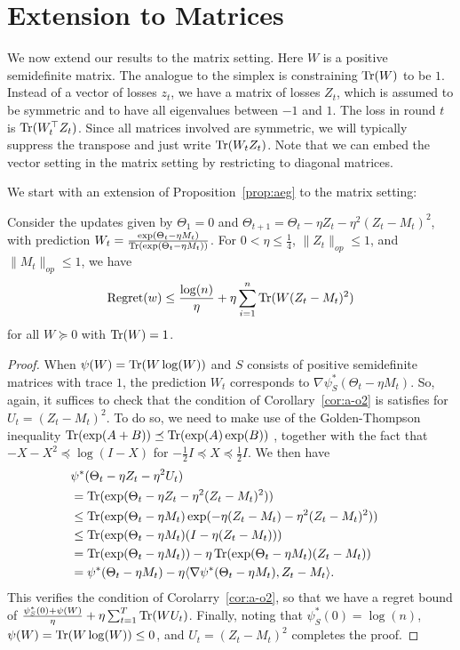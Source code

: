\documentclass[paper_icml.tex]{subfiles}
\begin{document}
\section{Extension to Matrices} 
\label{sec:matrix}
We now extend our results to the matrix setting. Here $W$ is a positive semidefinite 
matrix. The analogue to the simplex is constraining $\operatorname{Tr}(W)$ to be $1$. Instead of a vector 
of losses $z_t$, we have a matrix of losses $Z_t$, which is assumed to be symmetric and to 
have all eigenvalues between $-1$ and $1$. The loss in round $t$ is $\operatorname{Tr}(W_t^{\top}Z_t)$. 
Since all matrices involved are symmetric, we will typically suppress the transpose and 
just write $\operatorname{Tr}(W_tZ_t)$. Note that we can embed the vector setting in the matrix setting 
by restricting to diagonal matrices.

We start with an extension of Proposition~\ref{prop:aeg} to the matrix setting:
\begin{proposition}
\label{prop:maeg}
Consider the updates given by $\Theta_1 = 0$ and 
$\Theta_{t+1} = \Theta_t - \eta Z_t - \eta^2 (Z_t - M_t)^2$, 
with prediction $W_t = \frac{\exp(\Theta_t - \eta M_t)}{\operatorname{Tr}(\exp(\Theta_t - \eta M_t))}$. For $0 < \eta \leq \frac{1}{4}$, $\|Z_t\|_{op} \leq 1$, and $\|M_t\|_{op} \leq 1$, we have
\begin{equation}
\operatorname{Regret}(w) \leq \frac{\log(n)}{\eta} + \eta \sum_{i=1}^n \operatorname{Tr}(W(Z_t-M_t)^2)
\end{equation}
for all $W \succeq 0$ with $\operatorname{Tr}(W) = 1$.
\end{proposition}
\begin{proof}
When $\psi(W) = \operatorname{Tr}(W\log(W))$ and $S$ consists of positive semidefinite 
matrices with trace $1$, the prediction $W_t$ corresponds to 
$\nabla \psi_S^*(\Theta_t - \eta M_t)$. So, again, it suffices to check 
that the condition of Corollary~\ref{cor:a-o2} is satisfies for 
$U_t = (Z_t - M_t)^2$. To do so, we need to make use of the 
Golden-Thompson inequality $\operatorname{Tr}(\exp(A+B)) \preceq \operatorname{Tr}(\exp(A)\exp(B))$ \cite{golden, thompson}, 
together with the fact that $-X-X^2 \preceq \log(I-X)$ for 
$-\frac{1}{2}I \preceq X \preceq \frac{1}{2}I$. We then have
\begin{align*}
\lefteqn{\psi^*(\Theta_t - \eta Z_t - \eta^2 U_t)} \\
 &= \Tr(\exp(\Theta_t - \eta Z_t - \eta^2 (Z_t - M_t)^2)) \\
 &\leq \Tr(\exp(\Theta_t - \eta M_t)\exp(-\eta (Z_t - M_t) - \eta^2 (Z_t - M_t)^2)) \\
 &\leq \Tr(\exp(\Theta_t - \eta M_t)(I - \eta (Z_t - M_t))) \\
 &= \Tr(\exp(\Theta_t - \eta M_t)) - \eta \Tr(\exp(\Theta_t - \eta M_t)(Z_t - M_t)) \\
 &= \psi^*(\Theta_t - \eta M_t) - \eta \langle \nabla \psi^*(\Theta_t - \eta M_t), Z_t - M_t \rangle.
\end{align*}
This verifies the condition of Corolarry~\ref{cor:a-o2}, so that we have 
a regret bound of $\frac{\psi_S^*(0) + \psi(W)}{\eta} + \eta \sum_{t=1}^T \operatorname{Tr}(WU_t)$. 
Finally, noting that $\psi_S^*(0) = \log(n)$, $\psi(W) = \operatorname{Tr}(W\log(W)) \leq 0$, and 
$U_t = (Z_t - M_t)^2$ completes the proof.
\end{proof}
\end{document}
